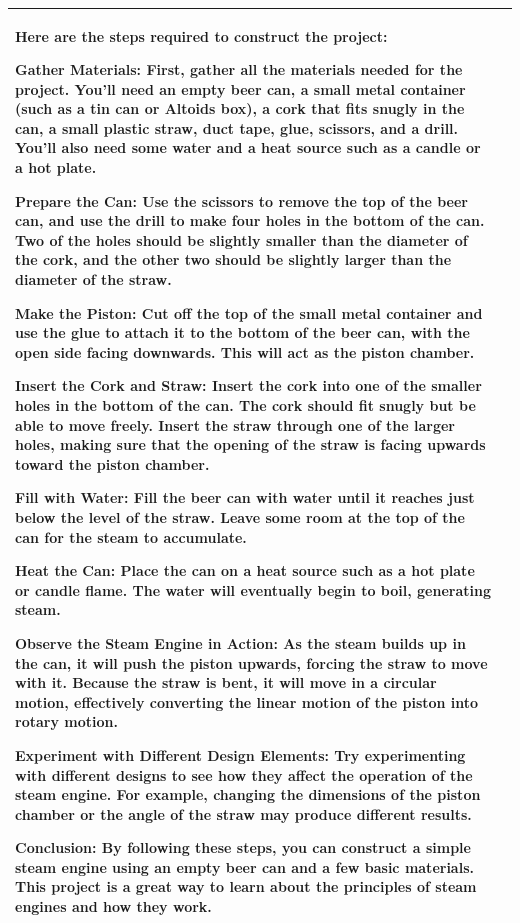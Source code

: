 \begin{table}[t]
\begin{tabular}{p{1em}l}
\begin{minipage}{45em}
\begin{lmttfont}
Here are the steps required to construct the project:

Gather Materials: First, gather all the materials needed for the project. You'll need an empty beer can, a small metal container (such as a tin can or Altoids box), a cork that fits snugly in the can, a small plastic straw, duct tape, glue, scissors, and a drill. You'll also need some water and a heat source such as a candle or a hot plate.

Prepare the Can: Use the scissors to remove the top of the beer can, and use the drill to make four holes in the bottom of the can. Two of the holes should be slightly smaller than the diameter of the cork, and the other two should be slightly larger than the diameter of the straw.

Make the Piston: Cut off the top of the small metal container and use the glue to attach it to the bottom of the beer can, with the open side facing downwards. This will act as the piston chamber.

Insert the Cork and Straw: Insert the cork into one of the smaller holes in the bottom of the can. The cork should fit snugly but be able to move freely. Insert the straw through one of the larger holes, making sure that the opening of the straw is facing upwards toward the piston chamber.

Fill with Water: Fill the beer can with water until it reaches just below the level of the straw. Leave some room at the top of the can for the steam to accumulate.

Heat the Can: Place the can on a heat source such as a hot plate or candle flame. The water will eventually begin to boil, generating steam.

Observe the Steam Engine in Action: As the steam builds up in the can, it will push the piston upwards, forcing the straw to move with it. Because the straw is bent, it will move in a circular motion, effectively converting the linear motion of the piston into rotary motion.

Experiment with Different Design Elements: Try experimenting with different designs to see how they affect the operation of the steam engine. For example, changing the dimensions of the piston chamber or the angle of the straw may produce different results.

Conclusion: By following these steps, you can construct a simple steam engine using an empty beer can and a few basic materials. This project is a great way to learn about the principles of steam engines and how they work.
\end{lmttfont}
 \end{minipage}\\

\bottomrule
  \end{tabular}
\end{table}

